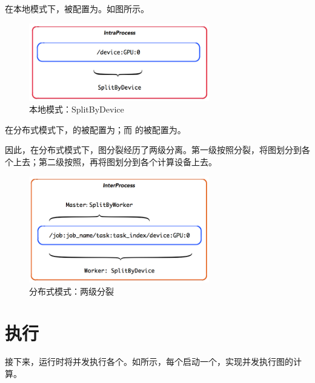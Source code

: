 \begin{content}
在本地模式下，被配置为。如图所示。

\begin{figure}[H]
\centering
\includegraphics[width=0.7\textwidth]{figures/intraprocess-splity-by-device.png}
\caption{本地模式：SplitByDevice}
 \label{fig:intraprocess-splity-by-device}
\end{figure}


在分布式模式下，的被配置为；而
的被配置为。

因此，在分布式模式下，图分裂经历了两级分离。第一级按照分裂，将图划分到各个上去；第二级按照，再将图划分到各个计算设备上去。

\begin{figure}[H]
\centering
\includegraphics[width=0.7\textwidth]{figures/interprocess-splity-by-worker.png}
\caption{分布式模式：两级分裂}
 \label{fig:interprocess-splity-by-worker}
\end{figure}

\section{执行}
\label{sec:graph-operation-exec}

接下来，运行时将并发执行各个。如所示，每个启动一个，实现并发执行图的计算。


\end{content}
